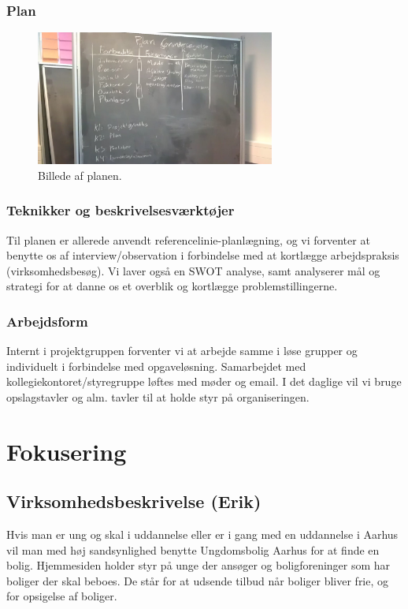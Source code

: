 \documentclass[12pt, a4paper]{report}
\begin{document}
\subsubsection{Plan}
\begin{figure}[ht!]
\centering
\includegraphics[width=0.7\textwidth]{forundersoegelsesplan.jpg}
\caption{Billede af planen.}
\end{figure}

\subsubsection{Teknikker og beskrivelsesværktøjer}
Til planen er allerede anvendt referencelinie-planlægning, og vi forventer at benytte os af interview/observation i forbindelse med at kortlægge arbejdspraksis (virksomhedsbesøg). Vi laver også en SWOT analyse, samt analyserer mål og strategi for at danne os et overblik og kortlægge problemstillingerne.

\subsubsection{Arbejdsform}
Internt i projektgruppen forventer vi at arbejde samme i løse grupper og individuelt i forbindelse med opgaveløsning. Samarbejdet med kollegiekontoret/styregruppe løftes med møder og email.
I det daglige vil vi bruge opslagstavler og alm. tavler til at holde styr på organiseringen.

\section{Fokusering}
\subsection{Virksomhedsbeskrivelse (Erik)}
Hvis man er ung og skal i uddannelse eller er i gang med en uddannelse i Aarhus vil man med høj sandsynlighed benytte Ungdomsbolig Aarhus for at finde en bolig. Hjemmesiden holder styr på unge der ansøger og boligforeninger som har boliger der skal beboes. De står for at udsende tilbud når boliger bliver frie, og for opsigelse af boliger.
\end{document}

